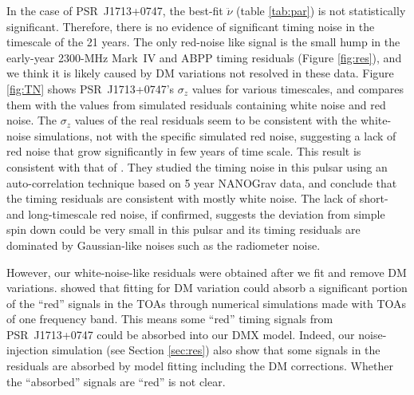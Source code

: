 In the case of PSR~J1713+0747, the
best-fit $\ddot{\nu}$ (table \ref{tab:par}) is not statistically significant. 
Therefore, there is no evidence of significant timing noise in the
timescale of the 21 years. The only red-noise like
signal is the small hump in the early-year 2300-MHz Mark~IV and ABPP timing residuals (Figure
\ref{fig:res}), and we think it is likely caused by DM variations not resolved in
these data. Figure \ref{fig:TN} 
shows PSR~J1713+0747's $\sigma_z$ values for various timescales, and compares them
with the values from simulated residuals containing white noise and
red noise. The $\sigma_z$ values of the real residuals seem to be consistent 
with the white-noise simulations, not with the specific simulated red noise,
suggesting a lack of red noise that grow significantly in few years of time
scale.%
This result is consistent with that of \citet{pjl+13}. They
studied the timing noise in this pulsar using an auto-correlation technique
based on 5 year NANOGrav data, and conclude that the timing residuals are
consistent with mostly white noise.
The lack of short- and long-timescale red noise, if confirmed,  suggests the
deviation from simple spin down could be very small in this pulsar and its timing
residuals are dominated by Gaussian-like noises such as the radiometer noise.

However, our white-noise-like residuals were obtained after we fit and remove
DM variations. \citet{kcs+13} showed that fitting for DM variation could
absorb a significant portion of the ``red'' signals in the TOAs through
numerical simulations made with TOAs of one frequency band. This means
some ``red'' timing signals from PSR~J1713+0747 could be absorbed into 
our DMX model. Indeed, our noise-injection simulation (see Section
\ref{sec:res})
also show that some signals in the residuals are absorbed by model fitting
including the DM corrections.
Whether the ``absorbed'' signals are ``red'' is not clear.


